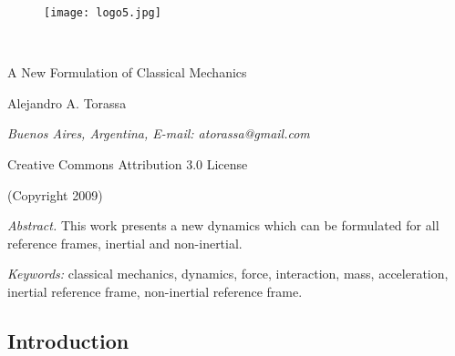 \documentclass[11pt]{article}
\begin{document}
\begin{figure}
\texttt{[image: logo5.jpg]}
\end{figure}

\enlargethispage{+0.3em}

\begin{center}

\ \vspace{-1.8em}

{\Large A New Formulation of Classical Mechanics}

\vspace{+1.2em}

\small

Alejandro A. Torassa

\medskip

\footnotesize

{\em Buenos Aires, Argentina, E-mail: atorassa@gmail.com}

\medskip

Creative Commons Attribution 3.0 License

\medskip

(Copyright 2009)

\end{center}

\vspace{+0.6em}

\footnotesize

{\em Abstract.\/} This work presents a new dynamics which can be formulated for all reference frames, inertial and non-inertial.

\medskip

{\em Keywords:\/} classical mechanics, dynamics, force, interaction, mass, acceleration, inertial reference frame, non-inertial reference frame.

\vspace{-0.3em}

\normalsize

{\centering\subsection*{Introduction}}
\end{document}
